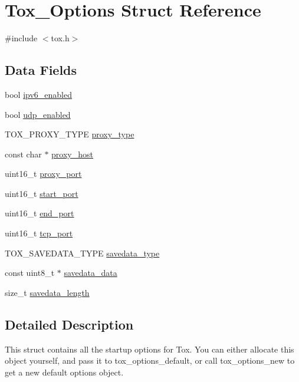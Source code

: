 \hypertarget{struct_tox___options}{\section{Tox\+\_\+\+Options Struct Reference}
\label{struct_tox___options}
}


{\ttfamily \#include $<$tox.\+h$>$}

\subsection*{Data Fields}
\begin{DoxyCompactItemize}
\item 
bool \hyperlink{struct_tox___options_a320e68fce8ebf1b6f0bb10494d800441}{ipv6\+\_\+enabled}
\item 
bool \hyperlink{struct_tox___options_a35c23f2b9cd2468e2a256ca93a21d5d5}{udp\+\_\+enabled}
\item 
T\+O\+X\+\_\+\+P\+R\+O\+X\+Y\+\_\+\+T\+Y\+P\+E \hyperlink{struct_tox___options_a32a512eb6e2c820735f1c51cd1075ce4}{proxy\+\_\+type}
\item 
const char $\ast$ \hyperlink{struct_tox___options_af7c34966a1703e0a031ce2674420c7cf}{proxy\+\_\+host}
\item 
uint16\+\_\+t \hyperlink{struct_tox___options_a0693366412d32f9b8ceba1bf4f320132}{proxy\+\_\+port}
\item 
uint16\+\_\+t \hyperlink{struct_tox___options_aa2de2e9258608a29877ef5d5610ea8f7}{start\+\_\+port}
\item 
uint16\+\_\+t \hyperlink{struct_tox___options_a72adaef23252363613b9ace5351ce521}{end\+\_\+port}
\item 
uint16\+\_\+t \hyperlink{struct_tox___options_a7c66715252e093e0b8b751a0c888623e}{tcp\+\_\+port}
\item 
T\+O\+X\+\_\+\+S\+A\+V\+E\+D\+A\+T\+A\+\_\+\+T\+Y\+P\+E \hyperlink{struct_tox___options_a825cfabf7be0224b12d09c8b1f5cbed6}{savedata\+\_\+type}
\item 
const uint8\+\_\+t $\ast$ \hyperlink{struct_tox___options_af298081c5f07deace07b2ced2c0a9c3d}{savedata\+\_\+data}
\item 
size\+\_\+t \hyperlink{struct_tox___options_a56c7956bddcb0d100c54e426b6e5f3ed}{savedata\+\_\+length}
\end{DoxyCompactItemize}


\subsection{Detailed Description}
This struct contains all the startup options for Tox. You can either allocate this object yourself, and pass it to tox\+\_\+options\+\_\+default, or call tox\+\_\+options\+\_\+new to get a new default options object. 

